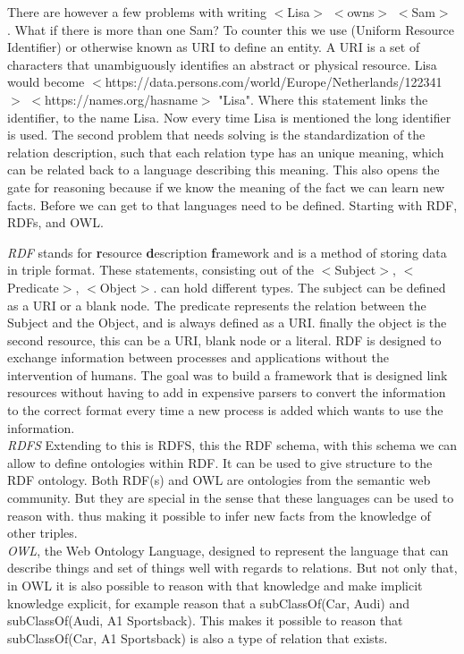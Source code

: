 \documentclass[11pt,letterpaper ,oneside ]{book}
\begin{document}
There are however a few problems with writing $<$Lisa$>$ $<$owns$>$ $<$Sam$>$ . What if there is more than one Sam? To counter this we use (Uniform Resource Identifier) or otherwise known as URI to define an entity. A URI is a set of characters that unambiguously identifies an abstract or physical resource. Lisa would become $<$https://data.persons.com/world/Europe/Netherlands/122341$>$ $<$https://names.org/hasname$>$ "Lisa". Where this statement links the identifier, to the name Lisa. Now every time Lisa is mentioned the long identifier is used. 
The second problem that needs solving is the standardization of the relation description, such that each relation type has an unique meaning, which can be related back to a language describing this meaning. This also opens the gate for reasoning because if we know the meaning of the fact we can learn new facts. Before we can get to that languages need to be defined. Starting with RDF, RDFs, and OWL.

\textit{RDF} \cite{rdfPrimer:2014} stands for \textbf{r}esource \textbf{d}escription \textbf{f}ramework and is a method of storing data in triple format. These statements, consisting out of the $<$Subject$>$, $<$Predicate$>$, $<$Object$>$. can hold different types. The subject can be defined as a URI or a blank node. The predicate represents the relation between the Subject and the Object, and is always defined as a URI. finally the object is the second resource, this can be a URI, blank node or a literal.
RDF is designed to exchange information between processes and applications without the intervention of humans. The goal was to build a framework that is designed link resources without having to add in expensive parsers to convert the information to the correct format every time a new process is added which wants to use the information.\\

\textit{RDFS} \cite{RDFSchema:2014} Extending to this is RDFS, this the RDF schema, with this schema we can allow to define ontologies within RDF. It can be used to give structure to the RDF ontology. Both RDF(s) and OWL are ontologies from the semantic web community. But they are special in the sense that these languages can be used to reason with. thus making it possible to infer new facts from the knowledge of other triples.\\

\textit{OWL}\cite{OWLPrimer:2012}, the Web Ontology Language, designed to represent the language that can describe things and set of things well with regards to relations. But not only that, in OWL it is also possible to reason with that knowledge and make implicit knowledge explicit, for example reason that a subClassOf(Car, Audi) and subClassOf(Audi, A1 Sportsback). This makes it possible to reason that subClassOf(Car, A1 Sportsback) is also a type of relation that exists. 
\end{document}
